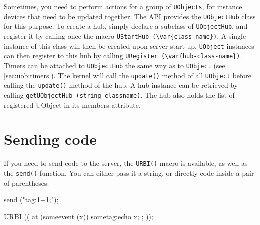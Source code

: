 Sometimes, you need to perform actions for a group of
\lstinline{UObjects}, for instance devices that need to be updated
together. The API provides the \lstinline{UObjectHub} class for this
purpose. To create a hub, simply declare a subclass of
\lstinline{UObjectHub}, and register it by calling once the macro
\lstinline|UStartHub (\var{class-name})|. A single instance of this class
will then be created upon server start-up. \lstinline{UObject}
instances can then register to this hub by calling
\lstinline|URegister (\var{hub-class-name})|. Timers can be attached to
\lstinline{UObjectHub} the same way as to \lstinline{UObject} (see
\autoref{sec:uob:timers}). The kernel will call the \lstinline{update()}
method of all \lstinline{UObject} before calling the
\lstinline{update()} method of the hub. A hub instance can be
retrieved by calling \lstinline{getUObjectHub (string classname)}. The
hub also holds the list of registered UObject in its members
attribute.

\section{Sending \urbi code}

If you need to send \urbi code to the server, the \lstinline{URBI()}
macro is available, as well as the \lstinline{send()} function. You
can either pass it a string, or directly \urbi code inside a pair of
parentheses:

\begin{urbifixme}
send ("tag:1+1;");

URBI (( at (someevent (x)) { sometag:echo x; }; ));
\end{urbifixme}



